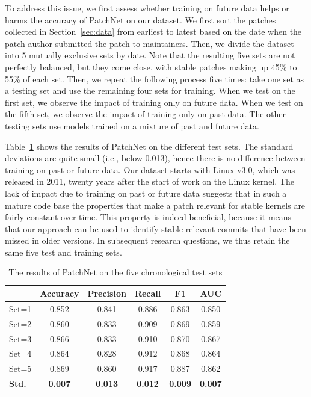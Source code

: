 To address this issue, we first assess whether training on future data
helps or harms the accuracy of PatchNet on our dataset.  We first sort the
patches collected in Section~\ref{sec:data} from earliest to latest based
on the date when the patch author submitted the patch to maintainers. Then,
we divide the dataset into 5 mutually exclusive sets by date. Note that the
resulting five sets are not perfectly balanced, but they come close, with
stable patches making up 45\% to 55\% of each set.  Then, we repeat the
following process five times: take one set as a testing set and use the
remaining four sets for training. When we test on the first set, we observe
the impact of training only on future data.  When we test on the fifth set,
we observe the impact of training only on past data.  The other testing
sets use models trained on a mixture of past and future data.

Table~\ref{tab:cross_valid_patchnet} shows the results of PatchNet on the
different test sets. The standard deviations are quite small (i.e., below
0.013), hence there is no difference between training on past or future
data.  Our dataset starts with Linux v3.0, which was released in 2011,
twenty years after the start of work on the Linux kernel.  The lack of
impact due to training on past or future data suggests that in such a
mature code base the properties that make a patch relevant for stable
kernels are fairly constant over time.  This property is indeed beneficial,
because it means that our approach can be used to identify stable-relevant commits that have been missed in older versions.  In subsequent research
questions, we thus retain the same five test and training sets.

\begin{table}[t!]
  \centering
  \caption{The results of PatchNet on the five chronological
    test sets}
    \begin{tabular}{|l|c|c|c|c|c|}
    \hline
          & \textbf{Accuracy} & \textbf{Precision} & \textbf{Recall} & \textbf{F1}    & \textbf{AUC} \\
    \hline
    \hline
    Set=1 & 0.852 & 0.841 & 0.886 & 0.863 & 0.850 \\
    \hline
    Set=2 & 0.860  & 0.833 & 0.909 & 0.869 & 0.859 \\
    \hline
    Set=3 & 0.866 & 0.833 & 0.910  & 0.870  & 0.867 \\
    \hline
    Set=4 & 0.864 & 0.828 & 0.912 & 0.868 & 0.864 \\
    \hline
    Set=5 & 0.869 & 0.860  & 0.917 & 0.887 & 0.862 \\
    \hline
    \hline
    \textbf{Std.} & \textbf{0.007} & \textbf{0.013} & \textbf{0.012} & \textbf{0.009} & \textbf{0.007} \\
    \hline
    \end{tabular}%
  \label{tab:cross_valid_patchnet}%
\end{table}%

